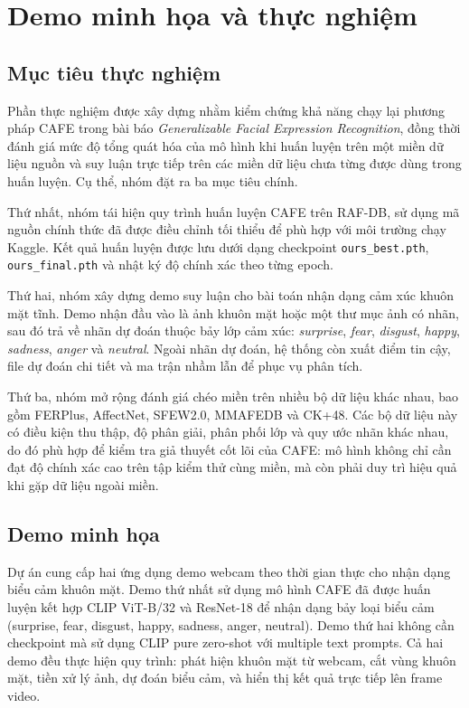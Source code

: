 \section{Demo minh họa và thực nghiệm}

\subsection{Mục tiêu thực nghiệm}

    Phần thực nghiệm được xây dựng nhằm kiểm chứng khả năng chạy lại phương pháp CAFE trong bài báo \textit{Generalizable Facial Expression Recognition}, đồng thời đánh giá mức độ tổng quát hóa của mô hình khi huấn luyện trên một miền dữ liệu nguồn và suy luận trực tiếp trên các miền dữ liệu chưa từng được dùng trong huấn luyện. Cụ thể, nhóm đặt ra ba mục tiêu chính.

    Thứ nhất, nhóm tái hiện quy trình huấn luyện CAFE trên RAF-DB, sử dụng mã nguồn chính thức đã được điều chỉnh tối thiểu để phù hợp với môi trường chạy Kaggle. Kết quả huấn luyện được lưu dưới dạng checkpoint \texttt{ours\_best.pth}, \texttt{ours\_final.pth} và nhật ký độ chính xác theo từng epoch.

    Thứ hai, nhóm xây dựng demo suy luận cho bài toán nhận dạng cảm xúc khuôn mặt tĩnh. Demo nhận đầu vào là ảnh khuôn mặt hoặc một thư mục ảnh có nhãn, sau đó trả về nhãn dự đoán thuộc bảy lớp cảm xúc: \textit{surprise}, \textit{fear}, \textit{disgust}, \textit{happy}, \textit{sadness}, \textit{anger} và \textit{neutral}. Ngoài nhãn dự đoán, hệ thống còn xuất điểm tin cậy, file dự đoán chi tiết và ma trận nhầm lẫn để phục vụ phân tích.

    Thứ ba, nhóm mở rộng đánh giá chéo miền trên nhiều bộ dữ liệu khác nhau, bao gồm FERPlus, AffectNet, SFEW2.0, MMAFEDB và CK+48. Các bộ dữ liệu này có điều kiện thu thập, độ phân giải, phân phối lớp và quy ước nhãn khác nhau, do đó phù hợp để kiểm tra giả thuyết cốt lõi của CAFE: mô hình không chỉ cần đạt độ chính xác cao trên tập kiểm thử cùng miền, mà còn phải duy trì hiệu quả khi gặp dữ liệu ngoài miền.

\subsection{Demo minh họa}
Dự án cung cấp hai ứng dụng demo webcam theo thời gian thực cho nhận dạng biểu cảm khuôn mặt. Demo thứ nhất  sử dụng mô hình CAFE đã được huấn luyện kết hợp CLIP ViT-B/32 và ResNet-18 để nhận dạng bảy loại biểu cảm (surprise, fear, disgust, happy, sadness, anger, neutral). Demo thứ hai không cần checkpoint mà sử dụng CLIP pure zero-shot với multiple text prompts. Cả hai demo đều thực hiện quy trình: phát hiện khuôn mặt từ webcam, cắt vùng khuôn mặt, tiền xử lý ảnh, dự đoán biểu cảm, và hiển thị kết quả trực tiếp lên frame video.

